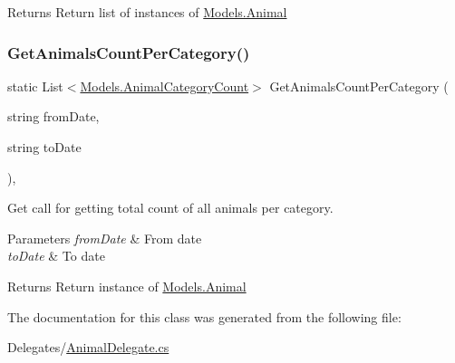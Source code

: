 \begin{DoxyReturn}{Returns}
Return list of instances of \hyperlink{classWildlifeTrackingApp_1_1Models_1_1Animal}{Models.\+Animal}
\end{DoxyReturn}
\mbox{\label{classWildlifeTrackingApp_1_1Delegates_1_1AnimalDelegate_a2fd0ae1a6560b820addb282b1e6e4ad3}} 
\subsubsection{\texorpdfstring{Get\+Animals\+Count\+Per\+Category()}{GetAnimalsCountPerCategory()}}
{\footnotesize\ttfamily static List$<$\hyperlink{classWildlifeTrackingApp_1_1Models_1_1AnimalCategoryCount}{Models.\+Animal\+Category\+Count}$>$ Get\+Animals\+Count\+Per\+Category (\begin{DoxyParamCaption}\item[{string}]{from\+Date,  }\item[{string}]{to\+Date }\end{DoxyParamCaption})\hspace{0.3cm}{\ttfamily [inline]}, {\ttfamily [static]}}



Get call for getting total count of all animals per category. 


\begin{DoxyParams}{Parameters}
{\em from\+Date} & From date\\
\hline
{\em to\+Date} & To date\\
\hline
\end{DoxyParams}
\begin{DoxyReturn}{Returns}
Return instance of \hyperlink{classWildlifeTrackingApp_1_1Models_1_1Animal}{Models.\+Animal}
\end{DoxyReturn}


The documentation for this class was generated from the following file\+:\begin{DoxyCompactItemize}
\item 
Delegates/\hyperlink{AnimalDelegate_8cs}{Animal\+Delegate.\+cs}\end{DoxyCompactItemize}
